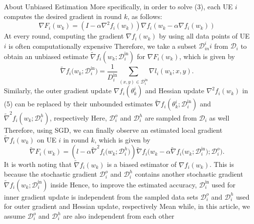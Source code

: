 About Unbiased Estimation
More specifically, in order to solve (3), each UE $i$ computes the desired gradient in round $k$, as follows:
\begin{equation*}
    \nabla F_i(w_k) = (I-\alpha \nabla^2f_i(w_k))\nabla f_i(w_k-\alpha\nabla f_i(w_k))
\end{equation*}
At every round, computing the gradient $\nabla f_i(w_k)$ by using all data points of UE $i$ is often computationally expensive Therefore, we take a subset $\mathcal{D}^i_{in} i$ from $\mathcal{D}_i$ to obtain an unbiased estimate $\tilde{\nabla}f_i(w_k;\mathcal{D}_i^{\mathrm{in}})$ for $\nabla F_i(w_k)$, which is given by
\begin{equation*}
    \tilde{\nabla}f_i\Big(w_k;\mathcal{D}_i^{\mathrm{in}}\Big)=\frac1{D_i^{\mathrm{in}}}\sum_{(x,y)\in\mathcal{D}_i^{\mathrm{in}}}\nabla l_i(w_k;x,y).
\end{equation*}
Similarly, the outer gradient update $\nabla f_i(\theta^i_k)$ and Hessian update $\nabla^2 f_i(w_k)$ in (5) can be replaced by their unbounded estimates $\tilde{\nabla}f_i(\theta_k^i;\mathcal{D}_i^{\mathrm{in}})$ and \ \ $\tilde{\nabla}^2f_i(w_k;\mathcal{D}_i^h)$, respectively Here, $\mathcal{D}_i^o$ and $\mathcal{D}_i^h$ are sampled from $\mathcal{D}_i$ as well Therefore, using SGD, we can finally observe an estimated local gradient $\tilde{\nabla}f_i(w_k)$ on UE $i$ in round $k$, which is given by
\begin{equation*}
    \tilde{\nabla}F_i(w_k)=\left(l-\alpha\tilde{\nabla}^2f_i\Big(w_k;\mathcal{D}_i^h\Big)\right)\tilde{\nabla}f_i\Big(w_k-\alpha\tilde{\nabla}f_i\Big(w_k;\mathcal{D}_i^{\mathrm{in}}\Big);\mathcal{D}_i^o\Big).
\end{equation*}
It is worth noting that $\tilde{\nabla}f_i(w_k)$ is a biased estimator of $\nabla f_i(w_k)$. This is because the stochastic gradient $\mathcal{D}_i^o$ and $\mathcal{D}_i^h$ contains another stochastic gradient $\tilde{\nabla}f_i(w_k;\mathcal{D}_i^\mathrm{in})$ inside Hence, to improve the estimated accuracy, $\mathcal{D}_i^\mathrm{in}$ used for inner gradient update is independent from the sampled data sets $\mathcal{D}_i^o$ and $\mathcal{D}_i^h$ used for outer gradient and Hessian update, respectively Mean while, in this article, we assume $\mathcal{D}_i^o$ and $\mathcal{D}_i^h$ are also independent from each other
